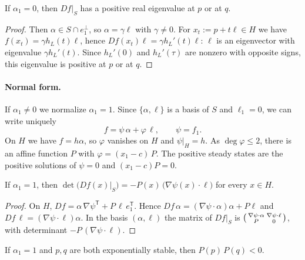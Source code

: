 \documentclass[11pt,a4paper]{report}
\begin{document}
\begin{lemma}\label{lem:alpha1-zero}
If $\alpha_1=0$, then $Df|_S$ has a positive real eigenvalue at $p$ or at $q$.
\end{lemma}

\begin{proof}
Then $\alpha\in S\cap e_1^\perp$, so $\alpha=\gamma\ell$ with $\gamma\neq0$. For $x_t:=p+t\ell\in H$ we have
$f(x_t)=\gamma h_L(t)\ell$, hence $Df(x_t)\ell=\gamma h_L'(t)\ell$: $\ell$ is an eigenvector with eigenvalue
$\gamma h_L'(t)$. Since $h_L'(0)$ and $h_L'(\tau)$ are nonzero with opposite signs, this eigenvalue is positive at $p$
or at $q$.
\end{proof}

\paragraph{Normal form.}
If $\alpha_1\neq0$ we normalize $\alpha_1=1$. Since $\{\alpha,\ell\}$ is a basis of $S$ and $\ell_1=0$, we can write
uniquely
\begin{equation}\label{eq:normal-form}
f=\psi\,\alpha+\varphi\,\ell,\qquad \psi=f_1 .
\end{equation}
On $H$ we have $f=h\alpha$, so $\varphi$ vanishes on $H$ and $\psi|_H=h$. As $\deg\varphi\le2$, there is an affine
function $P$ with $\varphi=(x_1-c)\,P$. The positive steady states are the positive solutions of $\psi=0$ and
$(x_1-c)P=0$.

\begin{lemma}\label{lem:det}
If $\alpha_1=1$, then $\det\bigl(Df(x)|_S\bigr)=-P(x)\,\bigl(\nabla\psi(x)\cdot\ell\bigr)$ for every $x\in H$.
\end{lemma}

\begin{proof}
On $H$, $Df=\alpha\,\nabla\psi^{\mathsf T}+P\,\ell\,e_1^{\mathsf T}$. Hence $Df\,\alpha=(\nabla\psi\cdot\alpha)\alpha+P\ell$
and $Df\,\ell=(\nabla\psi\cdot\ell)\alpha$. In the basis $(\alpha,\ell)$ the matrix of $Df|_S$ is
$\begin{psmallmatrix}\nabla\psi\cdot\alpha&\nabla\psi\cdot\ell\\ P&0\end{psmallmatrix}$, with determinant
$-P\,(\nabla\psi\cdot\ell)$.
\end{proof}

\begin{corollary}\label{cor:P-changes-sign}
If $\alpha_1=1$ and $p,q$ are both exponentially stable, then $P(p)\,P(q)<0$.
\end{corollary}
\end{document}
